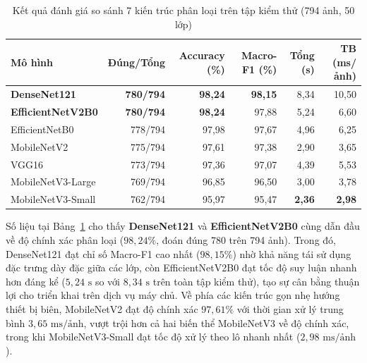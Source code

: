 \begin{table}[htbp]
    \centering
    \caption{Kết quả đánh giá so sánh 7 kiến trúc phân loại trên tập kiểm thử (794 ảnh, 50 lớp)}
    \label{tab:model-comparison-7}
    \begingroup
    \small
    \setlength{\tabcolsep}{4pt}
    \renewcommand{\arraystretch}{1.15}
    \begin{tabularx}{\textwidth}{@{}Xrrrrr@{}}
        \toprule
        \textbf{Mô hình} & \textbf{Đúng/Tổng} & \textbf{Accuracy (\%)} & \textbf{Macro-F1 (\%)} & \textbf{Tổng (s)} & \textbf{TB (ms/ảnh)} \\
        \midrule
        \textbf{DenseNet121}      & \textbf{780/794} & \textbf{98,24} & \textbf{98,15} & 8,34 & 10,50 \\
        \textbf{EfficientNetV2B0} & \textbf{780/794} & \textbf{98,24} & 97,88          & 5,24 & 6,60 \\
        EfficientNetB0            & 778/794          & 97,98          & 97,67          & 4,96 & 6,25 \\
        MobileNetV2               & 775/794          & 97,61          & 97,38          & 2,90 & 3,65 \\
        VGG16                     & 773/794          & 97,36          & 97,07          & 4,39 & 5,53 \\
        MobileNetV3-Large         & 769/794          & 96,85          & 96,50          & 3,00 & 3,78 \\
        MobileNetV3-Small         & 762/794          & 95,97          & 95,47          & \textbf{2,36} & \textbf{2,98} \\
        \bottomrule
    \end{tabularx}
    \endgroup
\end{table}

Số liệu tại Bảng~\ref{tab:model-comparison-7} cho thấy \textbf{DenseNet121} và \textbf{EfficientNetV2B0} cùng dẫn đầu về độ chính xác phân loại ($98{,}24\%$, đoán đúng 780 trên 794 ảnh). Trong đó, DenseNet121 đạt chỉ số Macro-F1 cao nhất ($98{,}15\%$) nhờ khả năng tái sử dụng đặc trưng dày đặc giữa các lớp, còn EfficientNetV2B0 đạt tốc độ suy luận nhanh hơn đáng kể ($5{,}24\text{ s}$ so với $8{,}34\text{ s}$ trên toàn tập kiểm thử), tạo sự cân bằng thuận lợi cho triển khai trên dịch vụ máy chủ. Về phía các kiến trúc gọn nhẹ hướng thiết bị biên, MobileNetV2 đạt độ chính xác $97{,}61\%$ với thời gian xử lý trung bình $3{,}65\text{ ms/ảnh}$, vượt trội hơn cả hai biến thể MobileNetV3 về độ chính xác, trong khi MobileNetV3-Small đạt tốc độ xử lý theo lô nhanh nhất ($2{,}98\text{ ms/ảnh}$).

